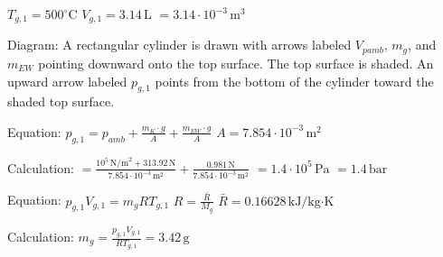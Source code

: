\( T_{g,1} = 500^\circ \text{C} \)  
\( V_{g,1} = 3.14 \, \text{L} \)  
\( = 3.14 \cdot 10^{-3} \, \text{m}^3 \)  

Diagram:  
A rectangular cylinder is drawn with arrows labeled \( V_{pamb} \), \( m_{g} \), and \( m_{EW} \) pointing downward onto the top surface. The top surface is shaded. An upward arrow labeled \( p_{g,1} \) points from the bottom of the cylinder toward the shaded top surface.  

Equation:  
\( p_{g,1} = p_{amb} + \frac{m_{K} \cdot g}{A} + \frac{m_{EW} \cdot g}{A} \)  
\( A = 7.854 \cdot 10^{-3} \, \text{m}^2 \)  

Calculation:  
\( = \frac{10^5 \, \text{N/m}^2 + 313.92 \, \text{N}}{7.854 \cdot 10^{-3} \, \text{m}^2} + \frac{0.981 \, \text{N}}{7.854 \cdot 10^{-3} \, \text{m}^2} \)  
\( = 1.4 \cdot 10^5 \, \text{Pa} \)  
\( = 1.4 \, \text{bar} \)  

Equation:  
\( p_{g,1} V_{g,1} = m_{g} R T_{g,1} \)  
\( R = \frac{\bar{R}}{M_{g}} \)  
\( \bar{R} = 0.16628 \, \text{kJ/kg·K} \)  

Calculation:  
\( m_{g} = \frac{p_{g,1} V_{g,1}}{R T_{g,1}} = 3.42 \, \text{g} \)